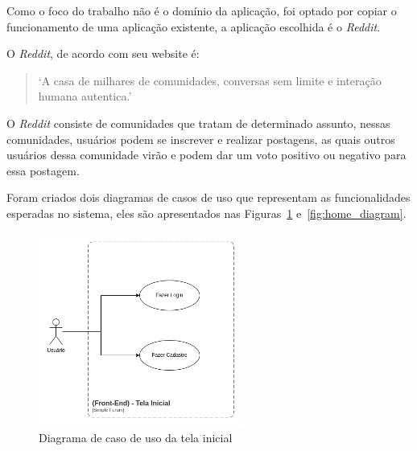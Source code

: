 \documentclass[12pt]{article}
\begin{document}
Como o foco do trabalho não é o domínio da aplicação, foi optado por copiar o funcionamento de uma aplicação
existente, a aplicação escolhida é o \textit{Reddit}.

O \textit{Reddit}, de acordo com seu website é:

\begin{quote}
  `A casa de milhares de comunidades, conversas sem
  limite e interação humana autentica.'
\end{quote}

O \textit{Reddit} consiste de comunidades que tratam de determinado assunto, nessas comunidades, usuários
podem se inscrever e realizar postagens, as quais outros usuários dessa comunidade virão e podem
dar um voto positivo ou negativo para essa postagem.

Foram criados dois diagramas de casos de uso que representam as funcionalidades esperadas no sistema,
eles são apresentados nas Figuras~\ref{fig:welcome_diagram} e~\ref{fig:home_diagram}.


\begin{figure}[H]
    \centering
    \includegraphics[width=0.6\textwidth]{diagrams/welcome_diagram.png}
    \caption{Diagrama de caso de uso da tela inicial}\label{fig:welcome_diagram}
\end{figure}
\end{document}
